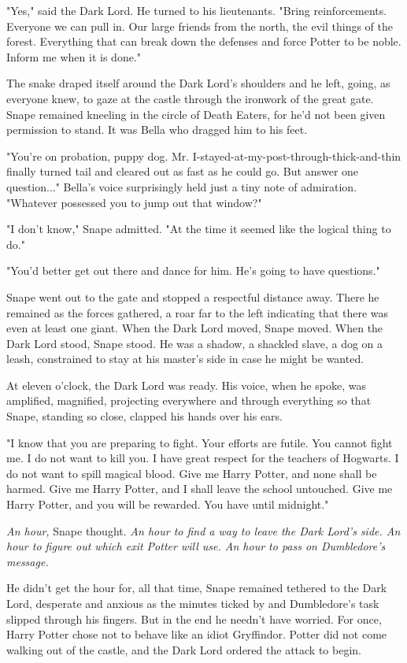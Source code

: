 \documentclass[a4paper,11pt]{article}
\begin{document}
"Yes," said the Dark Lord. He turned to his lieutenants. "Bring reinforcements. Everyone we can pull in. Our large friends from the north, the evil things of the forest. Everything that can break down the defenses and force Potter to be noble. Inform me when it is done."

The snake draped itself around the Dark Lord's shoulders and he left, going, as everyone knew, to gaze at the castle through the ironwork of the great gate. Snape remained kneeling in the circle of Death Eaters, for he'd not been given permission to stand. It was Bella who dragged him to his feet.

"You're on probation, puppy dog. Mr. I-stayed-at-my-post-through-thick-and-thin finally turned tail and cleared out as fast as he could go. But answer one question..." Bella's voice surprisingly held just a tiny note of admiration. "Whatever possessed you to jump out that window?"

"I don't know," Snape admitted. "At the time it seemed like the logical thing to do."

"You'd better get out there and dance for him. He's going to have questions."

Snape went out to the gate and stopped a respectful distance away. There he remained as the forces gathered, a roar far to the left indicating that there was even at least one giant. When the Dark Lord moved, Snape moved. When the Dark Lord stood, Snape stood. He was a shadow, a shackled slave, a dog on a leash, constrained to stay at his master's side in case he might be wanted.

At eleven o'clock, the Dark Lord was ready. His voice, when he spoke, was amplified, magnified, projecting everywhere and through everything so that Snape, standing so close, clapped his hands over his ears.

"I know that you are preparing to fight. Your efforts are futile. You cannot fight me. I do not want to kill you. I have great respect for the teachers of Hogwarts. I do not want to spill magical blood. Give me Harry Potter, and none shall be harmed. Give me Harry Potter, and I shall leave the school untouched. Give me Harry Potter, and you will be rewarded. You have until midnight."

\emph{An hour,} Snape thought. \emph{An hour to find a way to leave the Dark Lord's side. An hour to figure out which exit Potter will use. An hour to pass on Dumbledore's message.}

He didn't get the hour for, all that time, Snape remained tethered to the Dark Lord, desperate and anxious as the minutes ticked by and Dumbledore's task slipped through his fingers. But in the end he needn't have worried. For once, Harry Potter chose not to behave like an idiot Gryffindor. Potter did not come walking out of the castle, and the Dark Lord ordered the attack to begin.
\end{document}
